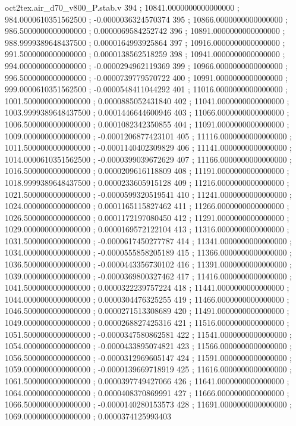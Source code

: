 \begin{filecontents}[overwrite]{oct2tex.air_d70_v800_P.stab.v}
394 ; 10841.0000000000000000 ; 984.0000610351562500 ; -0.0000036324570374
395 ; 10866.0000000000000000 ; 986.5000000000000000 ; 0.0000069584252742
396 ; 10891.0000000000000000 ; 988.9999389648437500 ; 0.0000164993925864
397 ; 10916.0000000000000000 ; 991.5000000000000000 ; 0.0000138562518259
398 ; 10941.0000000000000000 ; 994.0000000000000000 ; -0.0000294962119369
399 ; 10966.0000000000000000 ; 996.5000000000000000 ; -0.0000739779570722
400 ; 10991.0000000000000000 ; 999.0000610351562500 ; -0.0000548411044292
401 ; 11016.0000000000000000 ; 1001.5000000000000000 ; 0.0000885052431840
402 ; 11041.0000000000000000 ; 1003.9999389648437500 ; 0.0001446644600946
403 ; 11066.0000000000000000 ; 1006.5000000000000000 ; 0.0001082342350855
404 ; 11091.0000000000000000 ; 1009.0000000000000000 ; -0.0001206877423101
405 ; 11116.0000000000000000 ; 1011.5000000000000000 ; -0.0001140402309829
406 ; 11141.0000000000000000 ; 1014.0000610351562500 ; -0.0000399039672629
407 ; 11166.0000000000000000 ; 1016.5000000000000000 ; 0.0000209616118809
408 ; 11191.0000000000000000 ; 1018.9999389648437500 ; 0.0000233605915128
409 ; 11216.0000000000000000 ; 1021.5000000000000000 ; -0.0000599320519541
410 ; 11241.0000000000000000 ; 1024.0000000000000000 ; 0.0001165115827462
411 ; 11266.0000000000000000 ; 1026.5000000000000000 ; 0.0001172197080450
412 ; 11291.0000000000000000 ; 1029.0000000000000000 ; 0.0000169572122104
413 ; 11316.0000000000000000 ; 1031.5000000000000000 ; -0.0000617450277787
414 ; 11341.0000000000000000 ; 1034.0000000000000000 ; -0.0000555858205189
415 ; 11366.0000000000000000 ; 1036.5000000000000000 ; -0.0000443356730102
416 ; 11391.0000000000000000 ; 1039.0000000000000000 ; -0.0000369800327462
417 ; 11416.0000000000000000 ; 1041.5000000000000000 ; 0.0000322239757224
418 ; 11441.0000000000000000 ; 1044.0000000000000000 ; 0.0000304476325255
419 ; 11466.0000000000000000 ; 1046.5000000000000000 ; 0.0000271513308689
420 ; 11491.0000000000000000 ; 1049.0000000000000000 ; 0.0000268827425316
421 ; 11516.0000000000000000 ; 1051.5000000000000000 ; -0.0000347580862581
422 ; 11541.0000000000000000 ; 1054.0000000000000000 ; -0.0000433895074821
423 ; 11566.0000000000000000 ; 1056.5000000000000000 ; -0.0000312969605147
424 ; 11591.0000000000000000 ; 1059.0000000000000000 ; -0.0000139669718919
425 ; 11616.0000000000000000 ; 1061.5000000000000000 ; 0.0000397749427066
426 ; 11641.0000000000000000 ; 1064.0000000000000000 ; 0.0000408370869991
427 ; 11666.0000000000000000 ; 1066.5000000000000000 ; -0.0000140280153573
428 ; 11691.0000000000000000 ; 1069.0000000000000000 ; 0.0000374125993403

\end{filecontents}
